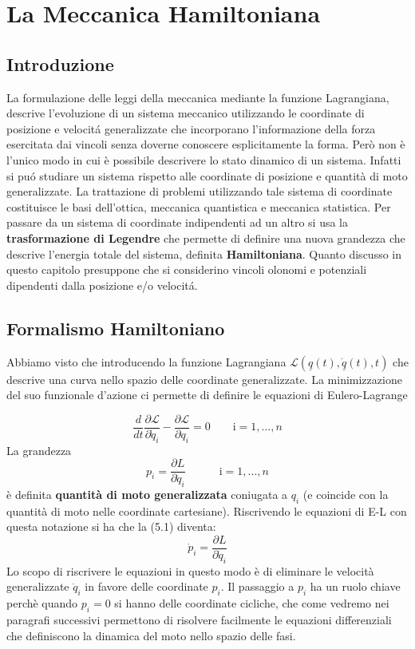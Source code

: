 \setcounter{chapter}{4}
\chapter{La Meccanica Hamiltoniana}
\section{Introduzione}
La formulazione delle leggi della meccanica mediante la funzione Lagrangiana, descrive l'evoluzione di un sistema meccanico utilizzando le coordinate di posizione e velocit\'{a} generalizzate che incorporano l'informazione della forza esercitata dai vincoli senza doverne conoscere esplicitamente la forma. Per\`{o} non \`{e} l'unico modo in cui \`{e} possibile descrivere lo stato dinamico di un sistema. Infatti si pu\'{o} studiare un sistema rispetto alle coordinate di posizione e quantit\`{a} di moto generalizzate. La trattazione di problemi utilizzando tale sistema di coordinate costituisce le basi dell'ottica, meccanica quantistica e meccanica statistica. Per passare da un sistema di coordinate indipendenti ad un altro si usa la \textbf{trasformazione di Legendre} che permette di definire una nuova grandezza che descrive l'energia totale del sistema, definita \textbf{Hamiltoniana}. Quanto discusso in questo capitolo presuppone che si considerino vincoli olonomi e potenziali dipendenti dalla posizione e/o velocit\'{a}.

\section{Formalismo Hamiltoniano}

Abbiamo visto che introducendo la funzione Lagrangiana $\mathcal{L}(\underline{q}(t),\underline{\dot q}(t),t)$ che descrive una curva nello spazio delle coordinate generalizzate. La minimizzazione del suo funzionale d'azione ci permette di definire le equazioni di Eulero-Lagrange

\begin{equation}
	\frac{d}{d t} \frac{\partial \mathcal{L}}{\partial \dot{q}_{i}}-\frac{\partial \mathcal{L}}{\partial q_i}=0 \quad \quad \text{i} = 1,...,n
\end{equation} 	
La grandezza
\begin{equation}
	p_i=\frac{\partial L}{\partial \dot{q}_i} \quad \quad \quad \text{i} = 1,...,n
\end{equation}
\`{e} definita \textbf{quantit\`{a} di moto generalizzata} coniugata a $q_i$ (e coincide con la quantit\`{a} di moto nelle coordinate cartesiane). Riscrivendo le equazioni di E-L con questa notazione si ha che la (5.1) diventa:
\begin{equation}
	\dot p_i = \frac{\partial L}{\partial \dot{q}_i}
\end{equation}
Lo scopo di riscrivere le equazioni in questo modo \`{e} di eliminare le velocit\`{a} generalizzate $\dot q_i$ in favore delle coordinate $p_i$. Il passaggio a $p_i$ ha un ruolo chiave perch\`{e} quando $p_i = 0$ si hanno delle coordinate cicliche, che come vedremo nei paragrafi successivi permettono di risolvere facilmente le equazioni differenziali che definiscono la dinamica del moto nello spazio delle fasi.
